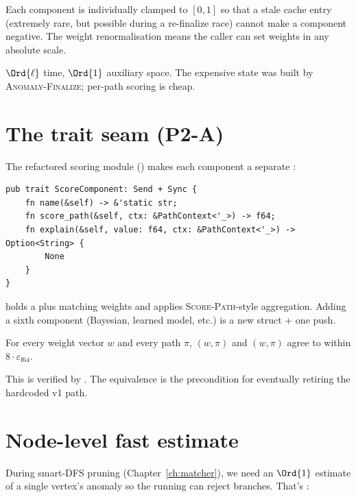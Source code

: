 Each component is individually clamped to $[0, 1]$ so that a stale
cache entry (extremely rare, but possible during a re-finalize
race) cannot make a component negative. The weight renormalisation
means the caller can set weights in any absolute scale.

\begin{complexity}
$\Ord{\ell}$ time, $\Ord{1}$ auxiliary space. The expensive state
was built by \textsc{Anomaly-Finalize}; per-path scoring is cheap.
\end{complexity}

\section{The trait seam (P2-A)}

The refactored scoring module
() makes each component a
separate :

\begin{lstlisting}[style=rust]
pub trait ScoreComponent: Send + Sync {
    fn name(&self) -> &'static str;
    fn score_path(&self, ctx: &PathContext<'_>) -> f64;
    fn explain(&self, value: f64, ctx: &PathContext<'_>) -> Option<String> {
        None
    }
}
\end{lstlisting}

 holds a
 plus matching weights and
applies \textsc{Score-Path}-style aggregation. Adding a sixth
component (Bayesian, learned model, etc.) is a new struct + one
 push.

\begin{theorem}[v1/v2 equivalence]
For every weight vector $w$ and every path $\pi$,
$(w, \pi)$ and
$(w, \pi)$ agree to within
$8 \cdot \varepsilon_{\text{f64}}$.
\end{theorem}

This is verified by . The
equivalence is the precondition for eventually retiring the hardcoded
v1 path.

\section{Node-level fast estimate}

During smart-DFS pruning (Chapter~\ref{ch:matcher}), we need an
$\Ord{1}$ estimate of a single vertex's anomaly so the running
 can reject branches. That's
:

